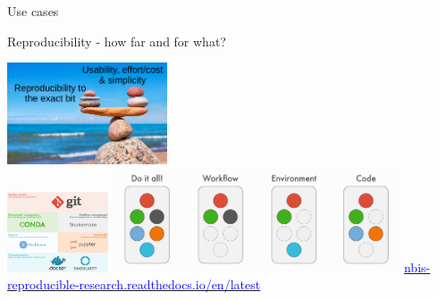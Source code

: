 \begin{frame}{}

\huge{Use cases}

\end{frame}

\begin{frame}{Reproducibility - how far and for what?}
\begin{center}
    \includegraphics[height=3cm]{shared/FAIR_equilibre.png}\\
    \includegraphics[width=3cm]{10_usecases/images/FAIR_NBIS_tools.png}
    \includegraphics[width=8.5cm]{10_usecases/images/FAIR_NBIS_pastilles.png}
    \href{https://nbis-reproducible-research.readthedocs.io/en/latest/}{\textcolor{blue}{nbis-reproducible-research.readthedocs.io/en/latest}}
\end{center}
\end{frame}
